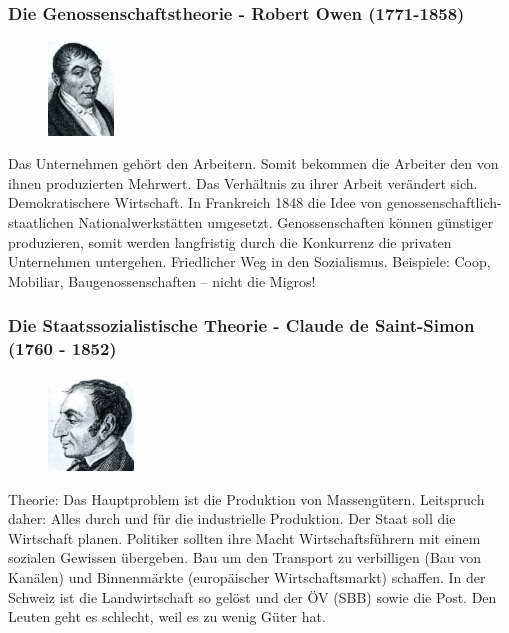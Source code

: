 \documentclass[10pt, openright=true]{scrartcl}
\begin{document}
\subsubsection{Die Genossenschaftstheorie - Robert Owen (1771-1858)}
\begin{figure} 
\vspace{-0.5cm}
  \includegraphics[height=2.5cm]{images/owen}
\end{figure}
Das Unternehmen gehört den Arbeitern. Somit bekommen die Arbeiter den von ihnen produzierten Mehrwert. Das Verhältnis zu ihrer Arbeit verändert sich. Demokratischere Wirtschaft. In Frankreich 1848 die Idee von genossenschaftlich- staatlichen Nationalwerkstätten umgesetzt. Genossenschaften können günstiger produzieren, somit werden langfristig durch die Konkurrenz die privaten Unternehmen untergehen. Friedlicher Weg in den Sozialismus. Beispiele: Coop, Mobiliar, Baugenossenschaften – nicht die Migros!
\subsubsection{Die Staatssozialistische Theorie - Claude de Saint-Simon (1760 - 1852)}
\begin{figure} 
\vspace{-0.5cm}
  \includegraphics[height=2.5cm]{images/declaude}
\end{figure}
Theorie: Das Hauptproblem ist die Produktion von Massengütern. Leitspruch daher: Alles durch und für die industrielle Produktion. Der Staat soll die Wirtschaft planen. Politiker sollten ihre Macht Wirtschaftsführern mit einem sozialen Gewissen übergeben. Bau um den Transport zu verbilligen (Bau von Kanälen) und Binnenmärkte (europäischer Wirtschaftsmarkt) schaffen. In der Schweiz ist die Landwirtschaft so gelöst und der ÖV (SBB) sowie die Post. Den Leuten geht es schlecht, weil es zu wenig Güter hat. 
\end{document}
